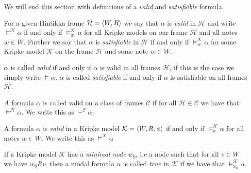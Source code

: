 \documentclass[../main.tex]{subfiles}
\begin{document}
We will end this section with definitions of a \textit{valid} and
\textit{satisfiable} formula.
\begin{defi}
For a given Hintikka frame $\mathcal{H}=\langle W,R\rangle$ we say that $\alpha$ is
\textit{valid} in $\mathcal{H}$ and write $\vDash^\mathcal{H}\alpha$ if and only if
$\vDash^\mathcal{K}_w\alpha$ for all Kripke models on our frame $\mathcal{H}$ and all
notes $w\in W$. Further we say that $\alpha$ is \textit{satisfiable} in $\mathcal{H}$
if and only if $\vDash^\mathcal{K}_w\alpha$ for some Kripke model $\mathcal{K}$ on
the frame $\mathcal{H}$ and some note $w\in W$.

$\alpha$ is called \textit{valid} if and only if $\alpha$ is valid in all frames
$\mathcal{H}$, if this is the case we simply write $\vDash\alpha$. $\alpha$ is
called \textit{satisfiable} if and only if $\alpha$ is satisfiable on all frames
$\mathcal{H}$.

$A$ formula $\alpha$ is called valid on a class of frames $\mathcal{C}$ if for
all $\mathcal{H}\in\mathcal{C}$ we have that $\vDash^\mathcal{H}\alpha$. We
write this as $\vdash^\mathcal{C}\alpha$.

A formula $\alpha$ is \textit{valid} in a Kripke model $\mathcal{K}=\langle
W,R,\phi\rangle$ if and only if $\vDash^\mathcal{K}_w\alpha$ for all notes $w\in
W$. We write this as $\vDash^\mathcal{K}\alpha$

If a Kripke model $\mathcal{K}$ has a \textit{minimal node} $w_0$, i.e a node
such that for all $v\in W$ we have $w_0Rv$, then a modal formula $\alpha$ is
called  \textit{true} in $\mathcal{K}$ if we have that
$\vDash_{w_0}^\mathcal{K}\alpha$.
\end{defi}
\end{document}
